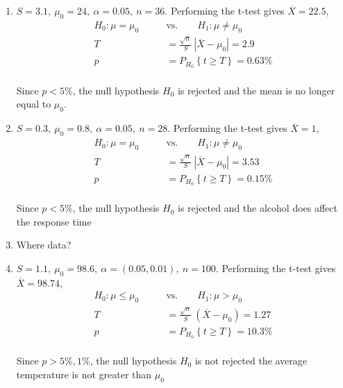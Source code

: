 \begin{enumerate}
	
	\item $ S = 3.1,\ \mu_0 = 24,\ \alpha = 0.05,\ n = 36$. Performing the t-test gives $ \overline{X} = 22.5 $,\\
	
		\begin{align}
			H_0 : \mu = \mu_0 \qquad &\text{vs.} \qquad H_1 : \mu \neq \mu_0 \nonumber \\
			T &= \frac{\sqrt{n}}{S}\ |\overline{X} - \mu_0| = 2.9 \nonumber \\
			p &= P_{H_0}\left\{t \geq T\right\} = 0.63\% 
		\end{align}\\
		Since $ p < 5\% $, the null hypothesis $ H_0 $ is rejected and the mean is no longer equal to $ \mu_0 $.\\
	
	
	\item $ S = 0.3,\ \mu_0 = 0.8,\ \alpha = 0.05,\ n = 28$. Performing the t-test gives $ \overline{X} = 1 $,\\
	
		\begin{align}
			H_0 : \mu = \mu_0 \qquad &\text{vs.} \qquad H_1 : \mu \neq \mu_0 \nonumber \\
			T &= \frac{\sqrt{n}}{S}\ |\overline{X} - \mu_0| = 3.53 \nonumber \\
			p &= P_{H_0}\left\{t \geq T\right\} = 0.15\% 
		\end{align}\\
		Since $ p < 5\% $, the null hypothesis $ H_0 $ is rejected and the alcohol does affect the response time\\
	
	
	\item Where data?\\
	
	\item $ S = 1.1,\ \mu_0 = 98.6,\ \alpha = (0.05, 0.01),\ n = 100$. Performing the t-test gives $ \overline{X} = 98.74 $,\\
	
		\begin{align}
			H_0 : \mu \leq \mu_0 \qquad &\text{vs.} \qquad H_1 : \mu > \mu_0 \nonumber \\
			T &= \frac{\sqrt{n}}{S}\ (\overline{X} - \mu_0) = 1.27 \nonumber \\
			p &= P_{H_0}\left\{t \geq T\right\} = 10.3\% 
		\end{align}\\
		Since $ p > 5\%, 1\% $, the null hypothesis $ H_0 $ is not rejected the average temperature is not greater than $ \mu_0 $\\
	

\end{enumerate}

